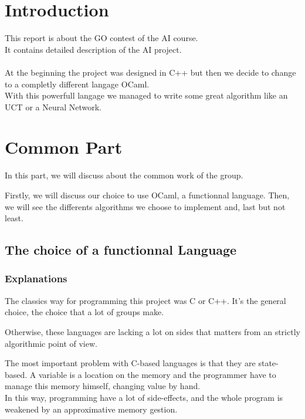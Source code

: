 

\tableofcontents

\chapter*{Introduction}

This report is about the GO contest of the AI course.\\
It contains detailed description of the AI project.\\
\\
At the beginning the project was designed in C++ but then we decide to change to
a completly different langage OCaml.\\
With this powerfull langage we managed to write some great algorithm like an UCT
or a Neural Network.\\


\chapter{Common Part}

In this part, we will discuss about the common work of the group.

Firstly, we will discuss our choice to use OCaml, a functionnal language.
Then, we will see the differents algorithms we choose to implement and, last but not least.

\section{The choice of a functionnal Language}

\subsection{Explanations}

The classics way for programming this project was C or C++. It's the general choice, the choice that a lot of groups make.

Otherwise, these languages are lacking a lot on sides that matters from an strictly algorithmic point of view.

The most important problem with C-based languages is that they are state-based. A variable is a location on the memory and the programmer have to manage this memory himself, changing value by hand.\\

In this way, programming have a lot of side-effects, and the whole program is weakened by  an approximative memory gestion.

